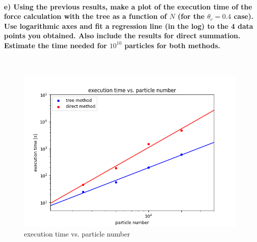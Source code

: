 \paragraph{e)
    Using the previous results, make a plot of the execution 
    time of the force calculation with the tree as a function of 
    $N$ (for the $\theta_c=0.4$ case). Use logarithmic axes and 
    fit a regression line (in the log) to the 4 data points you 
    obtained. Also include the results for direct summation. 
    Estimate the time needed for $10^{10}$ particles for both 
    methods.
} \ \\
    \begin{figure}[h!]
        \centering
        \includegraphics[width=\textwidth]{../plot/runtimes.png}
        \caption{execution time vs. particle number}
    \end{figure} \ \\ 
